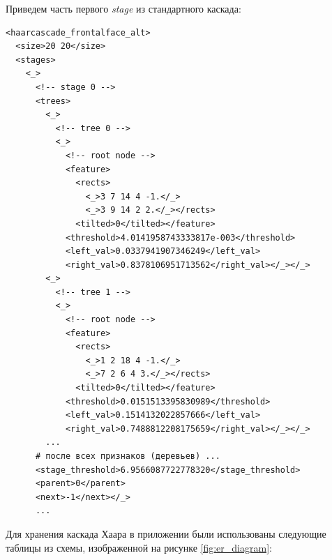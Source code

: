 Приведем часть первого \textit{stage} из стандартного каскада:
\begin{verbatim}
<haarcascade_frontalface_alt>
  <size>20 20</size>
  <stages>
    <_>
      <!-- stage 0 -->
      <trees>
        <_>
          <!-- tree 0 -->
          <_> 
            <!-- root node -->
            <feature>
              <rects>
                <_>3 7 14 4 -1.</_>
                <_>3 9 14 2 2.</_></rects>
              <tilted>0</tilted></feature>
            <threshold>4.0141958743333817e-003</threshold>
            <left_val>0.0337941907346249</left_val>
            <right_val>0.8378106951713562</right_val></_></_>
        <_>
          <!-- tree 1 -->
          <_>
            <!-- root node -->
            <feature>
              <rects>
                <_>1 2 18 4 -1.</_>
                <_>7 2 6 4 3.</_></rects>
              <tilted>0</tilted></feature>
            <threshold>0.0151513395830989</threshold>
            <left_val>0.1514132022857666</left_val>
            <right_val>0.7488812208175659</right_val></_></_>
        ...
      # после всех признаков (деревьев) ...
      <stage_threshold>6.9566087722778320</stage_threshold>
      <parent>0</parent>
      <next>-1</next></_>
      ...
\end{verbatim}

Для хранения каскада Хаара в приложении были использованы следующие таблицы из
схемы, изображенной на рисунке \ref{fig:er_diagram}:

